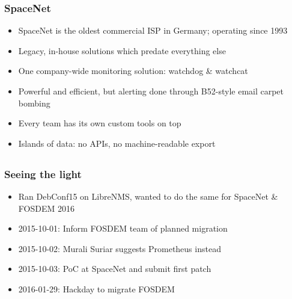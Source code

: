 \documentclass[t]{beamer}
\begin{document}
\begin{frame}
	\frametitle{SpaceNet}
	\begin{itemize}
		\item SpaceNet is the oldest commercial ISP in Germany; operating since 1993
		\item Legacy, in-house solutions which predate everything else
		\item One company-wide monitoring solution: watchdog \& watchcat
		\item Powerful and efficient, but alerting done through B52-style email carpet bombing
		\item Every team has its own custom tools on top
		\item Islands of data: no APIs, no machine-readable export
	\end{itemize}
\end{frame}

\subsection{}




\begin{frame}
	\frametitle{Seeing the light}
	\begin{itemize}
		\item Ran DebConf15 on LibreNMS, wanted to do the same for SpaceNet \& FOSDEM 2016
		\item 2015-10-01: Inform FOSDEM team of planned migration
		\item 2015-10-02: Murali Suriar suggests Prometheus instead
		\item 2015-10-03: PoC at SpaceNet and submit first patch
		\item 2016-01-29: Hackday to migrate FOSDEM
	\end{itemize}
\end{frame}
\end{document}
